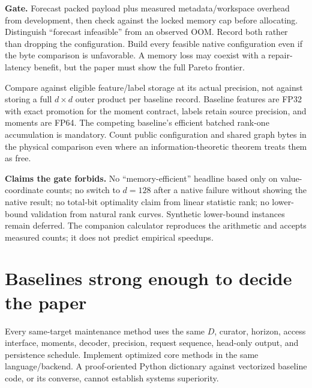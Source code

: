 \documentclass[11pt,a4paper]{article}
\begin{document}
\textbf{Gate.} Forecast packed payload plus measured metadata/workspace overhead from development, then check against the locked memory cap before allocating. Distinguish ``forecast infeasible'' from an observed OOM. Record both rather than dropping the configuration. Build every feasible native configuration even if the byte comparison is unfavorable. A memory loss may coexist with a repair-latency benefit, but the paper must show the full Pareto frontier.

Compare against eligible feature/label storage at its actual precision, not against storing a full $d\times d$ outer product per baseline record. Baseline features are FP32 with exact promotion for the moment contract, labels retain source precision, and moments are FP64. The competing baseline's efficient batched rank-one accumulation is mandatory. Count public configuration and shared graph bytes in the physical comparison even where an information-theoretic theorem treats them as free.

\textbf{Claims the gate forbids.} No ``memory-efficient'' headline based only on value-coordinate counts; no switch to $d=128$ after a native failure without showing the native result; no total-bit optimality claim from linear statistic rank; no lower-bound validation from natural rank curves. Synthetic lower-bound instances remain deferred. The companion calculator reproduces the arithmetic and accepts measured counts; it does not predict empirical speedups.

\section{Baselines strong enough to decide the paper}
Every same-target maintenance method uses the same $D$, curator, horizon, access interface, moments, decoder, precision, request sequence, head-only output, and persistence schedule. Implement optimized core methods in the same language/backend. A proof-oriented Python dictionary against vectorized baseline code, or its converse, cannot establish systems superiority.
\end{document}
